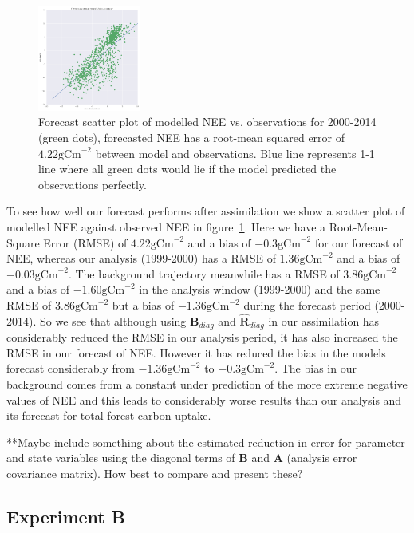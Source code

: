 \documentclass[11pt]{article}
\begin{document}
\begin{figure}[ht]
    \centering
    \includegraphics[width=0.3\textwidth]{bdiagNone_forecast_scatter.png}
    \caption{Forecast scatter plot of modelled NEE vs. observations for 2000-2014 (green dots), forecasted NEE has a root-mean squared error of $4.22 \text{gCm}^{-2}$ between model and observations. Blue line represents 1-1 line where all green dots would lie if the model predicted the observations perfectly.}
    \label{fig:forecastscatBR}
\end{figure}

To see how well our forecast performs after assimilation we show a scatter plot of modelled NEE against observed NEE in figure~\ref{fig:forecastscatBR}. Here we have a Root-Mean-Square Error (RMSE) of $4.22 \text{gCm}^{-2}$ and a bias of $-0.3 \text{gCm}^{-2}$ for our forecast of NEE, whereas our analysis (1999-2000) has a RMSE of $1.36 \text{gCm}^{-2}$ and a bias of $-0.03 \text{gCm}^{-2}$. The background trajectory meanwhile has a RMSE of $3.86 \text{gCm}^{-2}$ and a bias of $-1.60 \text{gCm}^{-2}$ in the analysis window (1999-2000) and the same RMSE of $3.86 \text{gCm}^{-2}$ but a bias of $-1.36 \text{gCm}^{-2}$ during the forecast period (2000-2014). So we see that although using $\textbf{B}_{diag}$ and $\hat{\textbf{R}}_{diag}$ in our assimilation has considerably reduced the RMSE in our analysis period, it has also increased the RMSE in our forecast of NEE. However it has reduced the bias in the models forecast considerably from $-1.36 \text{gCm}^{-2}$ to $-0.3 \text{gCm}^{-2}$. The bias in our background comes from a constant under prediction of the more extreme negative values of NEE and this leads to considerably worse results than our analysis and its forecast for total forest carbon uptake. 

{\color{red} **Maybe include something about the estimated reduction in error for parameter and state variables using the diagonal terms of \textbf{B} and \textbf{A} (analysis error covariance matrix). How best to compare and present these?}

\subsection{Experiment B} \label{sec:expb}
\end{document}
